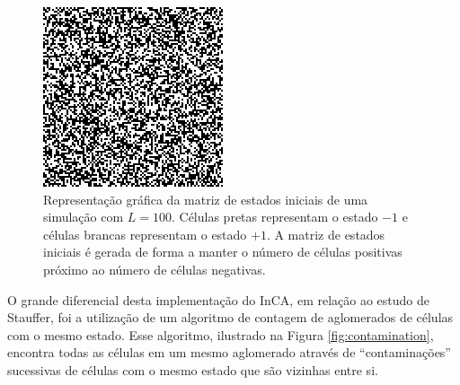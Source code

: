 \documentclass[11pt,a4paper,twocolumn,final]{article}
\begin{document}
\begin{figure}
    \centering
    \includegraphics[width=0.7\linewidth]{matrizL100Ciclo0.png}
    \caption{Representação gráfica da matriz de estados iniciais de uma simulação com $L=100$. Células pretas representam o estado $-1$ e células brancas representam o estado $+1$. A matriz de estados iniciais é gerada de forma a manter o número de células positivas próximo ao número de células negativas.}
    \label{fig:matrizL100Ciclo0}
\end{figure}

O grande diferencial desta implementação do InCA, em relação ao estudo de Stauffer, foi a utilização de um algoritmo de contagem de aglomerados de células com o mesmo estado. Esse algoritmo, ilustrado na Figura \ref{fig:contamination}, encontra todas as células em um mesmo aglomerado através de ``contaminações'' sucessivas de células com o mesmo estado que são vizinhas entre si.
\end{document}

